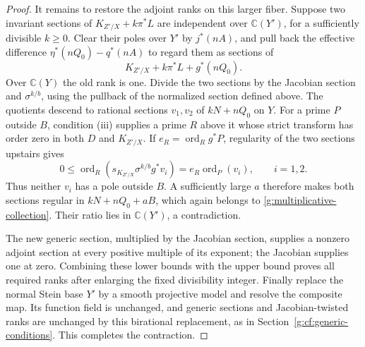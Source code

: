 \begin{proof}
It remains to restore the adjoint ranks on this larger fiber.
Suppose two invariant sections of $K_{Z'/X}+k\pi^*L$ are independent
over $\mathbb C(Y')$, for a sufficiently divisible $k\geq0$.
Clear their poles over $Y'$ by $j^*(nA)$, and pull back the effective
difference $\eta^*(nQ_0)-q^*(nA)$ to regard them as sections of
\[
 K_{Z'/X}+k\pi^*L+g^*(nQ_0).
\]
Over $\mathbb C(Y)$ the old rank is one. Divide the two sections by
the Jacobian section and $\sigma^{k/b}$, using the pullback of the
normalized section defined above. The quotients descend to rational
sections $v_1,v_2$ of $kN+nQ_0$ on $Y$.
For a prime $P$ outside $B$, condition (iii) supplies a prime $R$
above it whose strict transform has order zero in both $D$ and
$K_{Z'/X}$. If $e_R=\operatorname{ord}_R g^*P$, regularity of the
two sections upstairs gives
\[
 0\leq\operatorname{ord}_R(s_{K_{Z'/X}}\sigma^{k/b}g^*v_i)
      =e_R\operatorname{ord}_P(v_i),\qquad i=1,2.
\]
Thus neither $v_i$ has a pole outside $B$. A sufficiently large $a$ therefore makes
both sections regular in $kN+nQ_0+aB$, which again belongs to
\eqref{g:multiplicative-collection}. Their ratio lies in
$\mathbb C(Y')$, a contradiction.

The new generic section, multiplied by the Jacobian section, supplies
a nonzero adjoint section at every positive multiple of its exponent;
the Jacobian supplies one at zero. Combining these lower bounds with
the upper bound proves all required ranks after enlarging the fixed
divisibility integer. Finally replace the normal Stein base $Y'$ by a
smooth projective model and resolve the composite map. Its function
field is unchanged, and generic sections and Jacobian-twisted ranks
are unchanged by this birational replacement, as in
Section~\ref{g:cf:generic-conditions}. This completes the contraction.
\end{proof}
